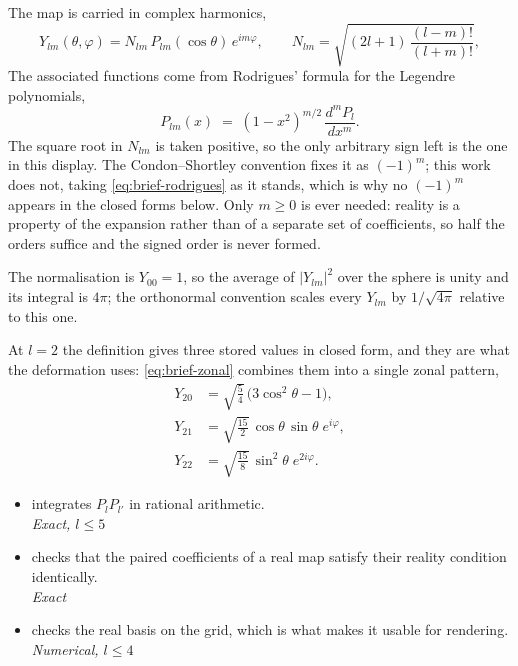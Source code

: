 The map is carried in complex harmonics,
\begin{equation}
  Y_{lm}(\theta,\varphi) = N_{lm}\, P_{lm}(\cos\theta)\, e^{im\varphi},
  \qquad
  N_{lm} = \sqrt{(2l+1)\,\frac{(l-m)!}{(l+m)!}} ,
  \label{eq:brief-ylm}
\end{equation}
The associated functions come from Rodrigues' formula for the Legendre polynomials,
\begin{equation}
  P_{lm}(x) \;=\; (1-x^2)^{m/2}\,\frac{d^m P_l}{dx^m} .
  \label{eq:brief-rodrigues}
\end{equation}
The square root in $N_{lm}$ is taken positive, so the only arbitrary sign left is the one in
this display.  The Condon--Shortley convention fixes it as $(-1)^m$; this work does not, taking
\eqref{eq:brief-rodrigues} as it stands, which is why no $(-1)^m$ appears in the closed forms
below.  Only $m \ge 0$ is ever needed: reality is a property of the expansion rather than of a
separate set of coefficients, so half the orders suffice and the signed order is never formed.

The normalisation is $Y_{00} = 1$, so the average of $|Y_{lm}|^2$ over the sphere is unity and
its integral is $4\pi$; the orthonormal convention scales every $Y_{lm}$ by $1/\sqrt{4\pi}$
relative to this one.

At $l = 2$ the definition gives three stored values in closed form, and they are what the
deformation uses: \eqref{eq:brief-zonal} combines them into a single zonal pattern,
\begin{equation}
  \begin{aligned}
    Y_{20} &= \sqrt{\tfrac54}\,\bigl(3\cos^2\theta - 1\bigr), \\
    Y_{21} &= \sqrt{\tfrac{15}{2}}\,\cos\theta\,\sin\theta\; e^{i\varphi}, \\
    Y_{22} &= \sqrt{\tfrac{15}{8}}\,\sin^2\theta\; e^{2i\varphi} .
  \end{aligned}
  \label{eq:brief-y2m}
\end{equation}

\begin{itemize}
  \item[$\checkmark$]  integrates $P_lP_{l'}$ in rational
    arithmetic.
    \\[1pt] \quad \emph{Exact, $l \le 5$}
  \item[$\checkmark$]  checks that the paired coefficients of a real
    map satisfy their reality condition identically.
    \\[1pt] \quad \emph{Exact}
  \item[$\checkmark$]  checks the real basis on the
    grid, which is what makes it usable for rendering.
    \\[1pt] \quad \emph{Numerical, $l \le 4$}
\end{itemize}

